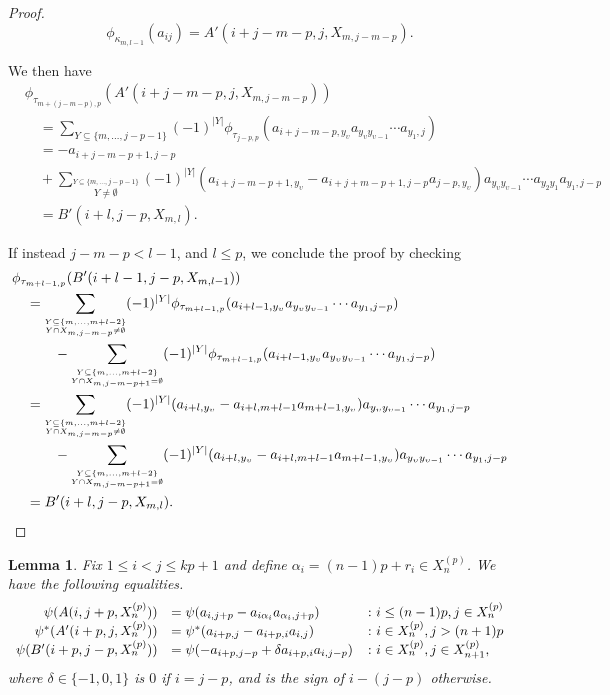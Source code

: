 \documentclass[11pt]{amsart}
\def\t{{\tau}}
\def\k{{\kappa}}
\def\a{\alpha}
\def\u{\upsilon}
\newtheorem{lem}[thm]{Lemma}
\theoremstyle{definition}
\begin{document}
\begin{proof}
$$\phi_{\k_{m,l-1}}(a_{ij}) = A'(i+j-m-p,j,X_{m,j-m-p}).$$

We then have
{\small
\begin{align*}
&\phi_{\tau_{m + (j-m-p),p}}(A'(i+j-m-p,j,X_{m,j-m-p}))\\
&\quad =\sum_{{\scriptscriptstyle Y\subseteq \{m,\ldots,j - p - 1\}}} (-1)^{|Y|} \phi_{\t_{j-p,p}}(a_{i+j-m-p,y_\u}a_{y_\u y_{\u-1}}\cdots a_{y_1,j})\\
&\quad = -a_{i+j-m-p+1,j-p}\\
&\quad + \sum_{{\scriptscriptstyle \overset{Y\subseteq \{m,\ldots,j - p - 1\}}{Y\ne\emptyset}}} (-1)^{|Y|} (a_{i+j-m-p+1,y_\u} -a_{i+j+m-p+1,j-p}a_{j-p,y_\u})a_{y_\u y_{\u-1}}\cdots a_{y_2y_1}a_{y_1,j-p}\\
&\quad = B'(i+l,j-p,X_{m,l}).
\end{align*}
}

If instead $j-m-p <l - 1$, and $l\le p$, we conclude the proof by checking
{\small
\begin{align*}
&\phi_{\tau_{m + l - 1,p}}(B'(i+l-1,j-p,X_{m,l-1})) \\
&\quad = \sum_{{\scriptscriptstyle \overset{Y\subseteq \{m,\ldots,m+l-2\}}{Y\cap X_{m,j-m-p}\ne\emptyset}}}(-1)^{|Y|}\phi_{\tau_{m + l - 1,p}}(a_{i+l-1,y_\u}a_{y_\u y_{\u-1}}\cdots a_{y_1,j-p}) \\
&\qquad\quad - \sum_{{\scriptscriptstyle \overset{Y\subseteq \{m,\ldots,m+l-2\}}{Y\cap X_{m,j-m-p+1}=\emptyset}}}(-1)^{|Y|}\phi_{\tau_{m + l - 1,p}}(a_{i+l-1,y_\u}a_{y_\u y_{\u-1}}\cdots a_{y_1,j-p}) \\
&\quad = \sum_{{\scriptscriptstyle \overset{Y\subseteq \{m,\ldots,m+l-2\}}{Y\cap X_{m,j-m-p}\ne\emptyset}}}(-1)^{|Y|}(a_{i+l,y_\u} - a_{i+l,m+l-1}a_{m+l-1,y_\u})a_{y_\u y_{\u-1}}\cdots a_{y_1,j-p} \\
&\qquad\quad - \sum_{{\scriptscriptstyle \overset{Y\subseteq \{m,\ldots,m+l-2\}}{Y\cap X_{m,j-m-p+1}=\emptyset}}}(-1)^{|Y|}(a_{i+l,y_\u} - a_{i+l,m+l-1}a_{m+l-1,y_\u})a_{y_\u y_{\u-1}}\cdots a_{y_1,j-p} \\
&\quad = B'(i+l,j-p,X_{m,l}). \qedhere
\end{align*}
}
\end{proof}


\begin{lem}\label{SimplifiedImages}
Fix $1\le i< j\le kp+1$ and define $\a_i = (n-1)p+r_i\in X_n^{(p)}$. We have the following equalities.
  \[\begin{array}{r l l} \psi(A(i,j+p,X_n^{(p)}))   &= \psi(a_{i,j+p} - a_{i\a_i}a_{\a_i,j+p})      & \colon i\le(n-1)p, j\in X_n^{(p)}\\
                  \psi^*(A'(i+p,j,X_n^{(p)})) &= \psi^*(a_{i+p,j} - a_{i+p,i}a_{i,j})       & \colon i\in X_n^{(p)}, j>(n+1)p\\
                \psi(B'(i+p,j-p,X_n^{(p)})) &= \psi(-a_{i+p,j-p} + \delta a_{i+p,i}a_{i,j-p}) & \colon i\in X_n^{(p)}, j\in X_{n+1}^{(p)},
  \end{array}\]
\noindent where $\delta\in\{-1,0,1\}$ is $0$ if $i=j-p$, and is the sign of $i-(j-p)$ otherwise.
\end{lem}
\end{document}
